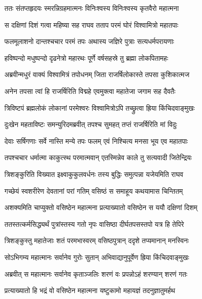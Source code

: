 
\twolineshloka
{ततः संतप्तहृदयः स्मरन्निग्रहमात्मनः}
{विनिःश्वस्य विनिःश्वस्य कृतवैरो महात्मना} %

\twolineshloka
{स दक्षिणां दिशं गत्वा महिष्या सह राघव}
{तताप परमं घोरं विश्वामित्रो महातपाः} %

\twolineshloka
{फलमूलाशनो दान्तश्चचार परमं तपः}
{अथास्य जज्ञिरे पुत्राः सत्यधर्मपरायणाः} %

\twolineshloka
{हविष्पन्दो मधुष्पन्दो दृढनेत्रो महारथः}
{पूर्णे वर्षसहस्रे तु ब्रह्मा लोकपितामहः} %

\twolineshloka
{अब्रवीन्मधुरं वाक्यं विश्वामित्रं तपोधनम्}
{जिता राजर्षिलोकास्ते तपसा कुशिकात्मज} %

\twolineshloka
{अनेन तपसा त्वां हि राजर्षिरिति विद्महे}
{एवमुक्त्वा महातेजा जगाम सह दैवतैः} %

\twolineshloka
{त्रिविष्टपं ब्रह्मलोकं लोकानां परमेश्वरः}
{विश्वामित्रोऽपि तच्छ्रुत्वा ह्रिया किंचिदवाङ्मुखः} %

\twolineshloka
{दुःखेन महताविष्टः समन्युरिदमब्रवीत्}
{तपश्च सुमहत् तप्तं राजर्षिरिति मां विदुः} %

\twolineshloka
{देवाः सर्षिगणाः सर्वे नास्ति मन्ये तपः फलम्}
{एवं निश्चित्य मनसा भूय एव महातपाः} %

\twolineshloka
{तपश्चचार धर्मात्मा काकुत्स्थ परमात्मवान्}
{एतस्मिन्नेव काले तु सत्यवादी जितेन्द्रियः} %

\twolineshloka
{त्रिशङ्कुरिति विख्यात इक्ष्वाकुकुलवर्धनः}
{तस्य बुद्धिः समुत्पन्ना यजेयमिति राघव} %

\twolineshloka
{गच्छेयं स्वशरीरेण देवतानां परां गतिम्}
{वसिष्ठं स समाहूय कथयामास चिन्तितम्} %

\twolineshloka
{अशक्यमिति चाप्युक्तो वसिष्ठेन महात्मना}
{प्रत्याख्यातो वसिष्ठेन स ययौ दक्षिणां दिशम्} %

\twolineshloka
{ततस्तत्कर्मसिद्ध्यर्थं पुत्रांस्तस्य गतो नृपः}
{वासिष्ठा दीर्घतपसस्तपो यत्र हि तेपिरे} %

\twolineshloka
{त्रिशङ्कुस्तु महातेजाः शतं परमभास्वरम्}
{वसिष्ठपुत्रान् ददृशे तप्यमानान् मनस्विनः} %

\twolineshloka
{सोऽभिगम्य महात्मानः सर्वानेव गुरोः सुतान्}
{अभिवाद्यानुपूर्वेण ह्रिया किंचिदवाङ्मुखः} %

\twolineshloka
{अब्रवीत् स महात्मानः सर्वानेव कृताञ्जलिः}
{शरणं वः प्रपन्नोऽहं शरण्यान् शरणं गतः} %

\twolineshloka
{प्रत्याख्यातो हि भद्रं वो वसिष्ठेन महात्मना}
{यष्टुकामो महायज्ञं तदनुज्ञातुमर्हथ} %

